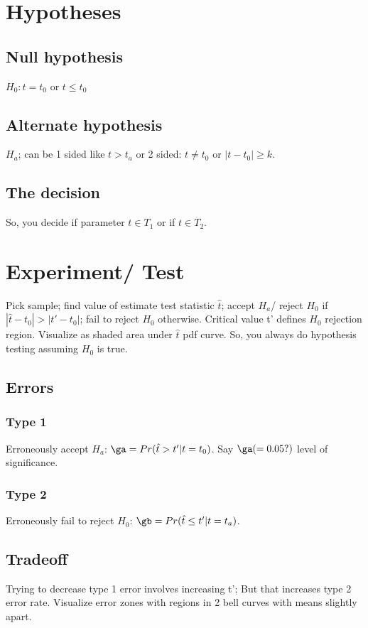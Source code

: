 \documentclass[oneside, article]{memoir}
\begin{document}
\section{Hypotheses}
\subsection{Null hypothesis}
$H_{0}: t = t_{0}$ or $t\leq t_{0}$

\subsection{Alternate hypothesis}
$H_{a}$; can be 1 sided like $t > t_{a}$ or 2 sided: $t \neq t_{0}$ or $|t-t_{0}| \geq k$.

\subsection{The decision}
So, you decide if parameter $t \in T_1$ or if $t \in T_2$.

\section{Experiment/ Test}
Pick sample; find value of estimate test statistic $\hat{t}$; accept $H_{a}$/ reject $H_{0}$ if $|\hat{t} - t_0| > |t' - t_0|$; fail to reject $H_{0}$ otherwise. Critical value t' defines $H_{0}$ rejection region. Visualize as shaded area under $\hat{t}$ pdf curve. So, you always do hypothesis testing assuming $H_{0}$ is true.

\subsection{Errors}
\subsubsection{Type 1}
Erroneously accept $H_{a}$: $\ga = Pr(\hat{t} > t'|t=t_{0})$. Say $\ga (= 0.05?)$ level of significance.

\subsubsection{Type 2}
Erroneously fail to reject $H_{0}$: $\gb = Pr(\hat{t} \leq t'|t=t_{a})$.

\subsection{Tradeoff}
Trying to decrease type 1 error involves increasing t'; But that increases type 2 error rate. Visualize error zones with regions in 2 bell curves with means slightly apart.
\end{document}
